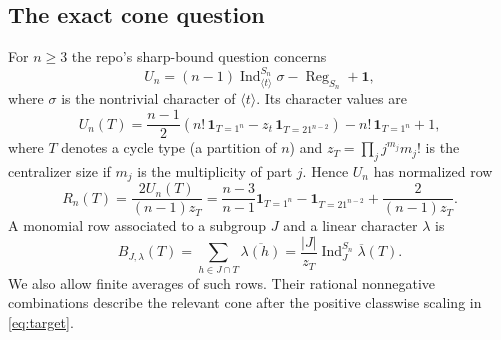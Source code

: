 \documentclass[11pt]{article}
\theoremstyle{remark}\newtheorem{remark}[theorem]{Remark}
\newcommand{\Ind}{\operatorname{Ind}}
\newcommand{\Reg}{\operatorname{Reg}}
\newcommand{\one}{\mathbf{1}}
\begin{document}
\subsection{The exact cone question}
For $n\ge3$ the repo's sharp-bound question concerns
\[
 U_n=(n-1)\Ind_{\langle t\rangle}^{S_n}\sigma-\Reg_{S_n}+\one,
\]
where $\sigma$ is the nontrivial character of $\langle t\rangle$. Its character values are
\[
 U_n(T)=\frac{n-1}{2}\left(n!\,\one_{T=1^n}-z_t\,\one_{T=21^{n-2}}\right)-n!\,\one_{T=1^n}+1,
\]
where $T$ denotes a cycle type (a partition of $n$) and $z_T=\prod_j j^{m_j}m_j!$ is the centralizer size if $m_j$ is the multiplicity of part $j$. Hence $U_n$ has normalized row
\begin{equation}\label{eq:target}
 R_n(T)=\frac{2U_n(T)}{(n-1)z_T}
 =\frac{n-3}{n-1}\one_{T=1^n}-\one_{T=21^{n-2}}+\frac{2}{(n-1)z_T}.
\end{equation}
A monomial row associated to a subgroup $J$ and a linear character $\lambda$ is
\begin{equation}\label{eq:row}
 B_{J,\lambda}(T)=\sum_{h\in J\cap T}\overline{\lambda(h)}
 =\frac{|J|}{z_T}\Ind_J^{S_n}\overline\lambda(T).
\end{equation}
We also allow finite averages of such rows. Their rational nonnegative combinations describe the relevant cone after the positive classwise scaling in \eqref{eq:target}.
\end{document}
